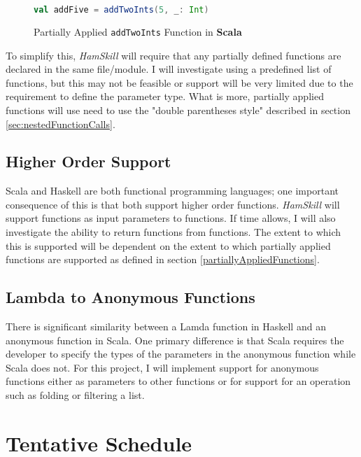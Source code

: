 \documentclass{report}
\begin{document}
\begin{figure}[H]
\begin{mdframed}
\begin{lstlisting}[language=Scala]
val addFive = addTwoInts(5, _: Int)
\end{lstlisting}
\end{mdframed}
\caption{Partially Applied {\tt addTwoInts} Function in \textbf{Scala}}\label{fig:addFiveScala}
\end{figure}

To simplify this, \emph{HamSkill} will require that any partially defined functions are declared in the same file/module.  I will investigate using a predefined list of functions, but this may not be feasible or support will be very limited due to the requirement to define the parameter type.  What is more, partially applied functions will use need to use the "double parentheses style" described in section \ref{sec:nestedFunctionCalls}.

\subsection{Higher Order Support}

Scala and Haskell are both functional programming languages; one important consequence of this is that both support higher order functions.  \emph{HamSkill} will support functions as input parameters to functions.  If time allows, I will also investigate the ability to return functions from functions.  The extent to which this is supported will be dependent on the extent to which partially applied functions are supported as defined in section \ref{partiallyAppliedFunctions}.

\subsection{Lambda to Anonymous Functions}

There is significant similarity between a Lamda function in Haskell and an anonymous function in Scala.  One primary difference is that Scala requires the developer to specify the types of the parameters in the anonymous function while Scala does not. For this project, I will implement support for anonymous functions either as parameters to other functions or for support for an operation such as folding or filtering a list. 

\section{Tentative Schedule}
\end{document}
